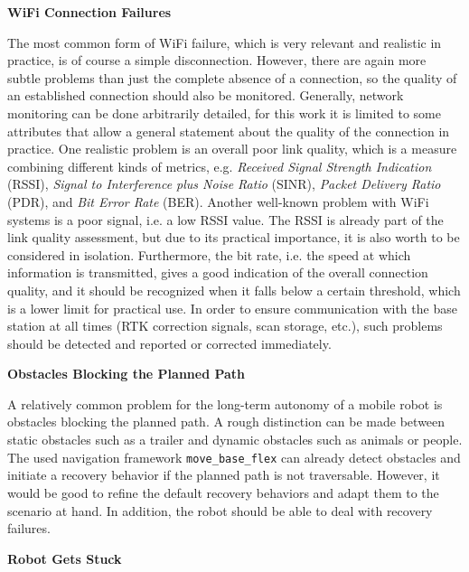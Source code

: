 \documentclass[english, master, utf8]{base/thesis_KBS}
\newcommand{\code}[1]{\colorbox{light-gray}{\texttt{#1}}}
\begin{document}
\noindent
\textbf{WiFi Connection Failures}\newline

\noindent
The most common form of WiFi failure, which is very relevant and realistic in practice, is of course a simple disconnection.
However, there are again more subtle problems than just the complete absence of a connection, so the quality of an established connection should also be monitored.
Generally, network monitoring can be done arbitrarily detailed, for this work it is limited to some attributes that allow a general statement about the quality of
the connection in practice. One realistic problem is an overall poor link quality, which is a measure combining different kinds of metrics, e.g.
\textit{Received Signal Strength Indication} (RSSI), \textit{Signal to Interference plus Noise Ratio} (SINR), \textit{Packet Delivery Ratio} (PDR), and
\textit{Bit Error Rate} (BER). \cite{Vlavianos:2008} Another well-known problem with WiFi systems is a poor signal, i.e. a low RSSI value. The RSSI is already part of
the link quality assessment, but due to its practical importance, it is also worth to be considered in isolation. Furthermore, the bit rate, i.e. the speed at which
information is transmitted, gives a good indication of the overall connection quality, and it should be recognized when it falls below a certain threshold, which is a
lower limit for practical use. In order to ensure communication with the base station at all times (RTK correction signals, scan storage, etc.), such problems should be
detected and reported or corrected immediately.\newline

\noindent
\textbf{Obstacles Blocking the Planned Path}\newline

\noindent
A relatively common problem for the long-term autonomy of a mobile robot is obstacles blocking the planned path.
A rough distinction can be made between static obstacles such as a trailer and dynamic obstacles such as animals or people.
The used navigation framework \code{move\_base\_flex} can already detect obstacles and initiate a recovery behavior if the planned path is not traversable.
However, it would be good to refine the default recovery behaviors and adapt them to the scenario at hand. In addition, the robot should be able to deal with
recovery failures.\newline

\noindent
\textbf{Robot Gets Stuck}\newline
\end{document}
